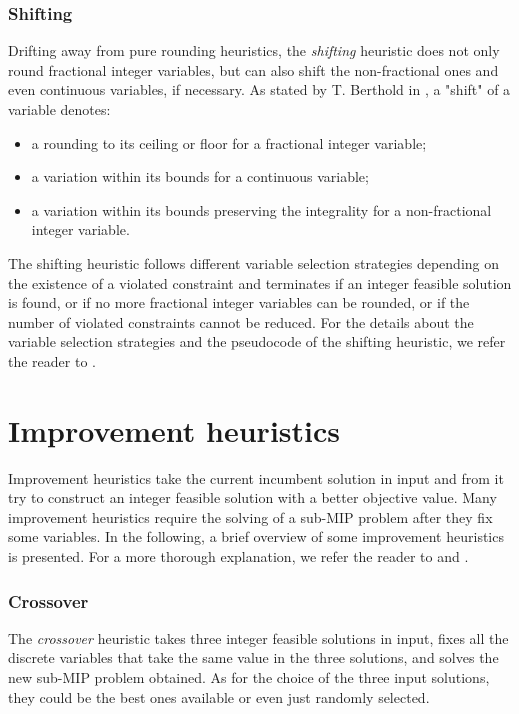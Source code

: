 \documentclass[a4paper,12pt,twoside]{scrbook}
\begin{document}
\subsubsection{Shifting}
Drifting away from pure rounding heuristics, the \textit{shifting} heuristic does not only round fractional integer variables, but can also shift the non-fractional ones and even continuous variables, if necessary.
As stated by T. Berthold in \cite{berthold2006}, a "shift" of a variable denotes:
\begin{itemize}
	\item a rounding to its ceiling or floor for a fractional integer variable;
	\item a variation within its bounds for a continuous variable;
	\item a variation within its bounds preserving the integrality for a non-fractional integer variable.
\end{itemize}
The shifting heuristic follows different variable selection strategies depending on the existence of a violated constraint and terminates if an integer feasible solution is found, or if no more fractional integer variables can be rounded, or if the number of violated constraints cannot be reduced. For the details about the variable selection strategies and the pseudocode of the shifting heuristic, we refer the reader to \cite{berthold2006}. 

\section{Improvement heuristics} \label{sec:improvementheur}
Improvement heuristics take the current incumbent solution in input and from it try to construct an integer feasible solution with a better objective value. Many improvement heuristics require the solving of a sub-MIP problem after they fix some variables. In the following, a brief overview of some improvement heuristics is presented. For a more thorough explanation, we refer the reader to \cite{hendel2011} and \cite{achterberg2012}. \par 
\subsubsection{Crossover}
The \textit{crossover} heuristic takes three integer feasible solutions in input, fixes all the discrete variables that take the same value in the three solutions, and solves the new sub-MIP problem obtained. As for the choice of the three input solutions, they could be the best ones available or even just randomly selected.
\end{document}
